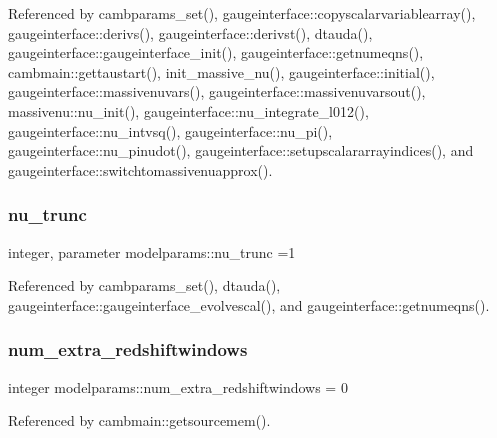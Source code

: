 Referenced by cambparams\+\_\+set(), gaugeinterface\+::copyscalarvariablearray(), gaugeinterface\+::derivs(), gaugeinterface\+::derivst(), dtauda(), gaugeinterface\+::gaugeinterface\+\_\+init(), gaugeinterface\+::getnumeqns(), cambmain\+::gettaustart(), init\+\_\+massive\+\_\+nu(), gaugeinterface\+::initial(), gaugeinterface\+::massivenuvars(), gaugeinterface\+::massivenuvarsout(), massivenu\+::nu\+\_\+init(), gaugeinterface\+::nu\+\_\+integrate\+\_\+l012(), gaugeinterface\+::nu\+\_\+intvsq(), gaugeinterface\+::nu\+\_\+pi(), gaugeinterface\+::nu\+\_\+pinudot(), gaugeinterface\+::setupscalararrayindices(), and gaugeinterface\+::switchtomassivenuapprox().

\mbox{\label{namespacemodelparams_a31f4e37e9eb0841e803020950fe2ce52}} 
\subsubsection{\texorpdfstring{nu\+\_\+trunc}{nu\_trunc}}
{\footnotesize\ttfamily integer, parameter modelparams\+::nu\+\_\+trunc =1}



Referenced by cambparams\+\_\+set(), dtauda(), gaugeinterface\+::gaugeinterface\+\_\+evolvescal(), and gaugeinterface\+::getnumeqns().

\mbox{\label{namespacemodelparams_a9b9513ec2c0807b724060d4cc2b1f209}} 
\subsubsection{\texorpdfstring{num\+\_\+extra\+\_\+redshiftwindows}{num\_extra\_redshiftwindows}}
{\footnotesize\ttfamily integer modelparams\+::num\+\_\+extra\+\_\+redshiftwindows = 0}



Referenced by cambmain\+::getsourcemem().

\mbox{\label{namespacemodelparams_a6617a935c25965a12d1cfd1f3a2a3e12}} 
